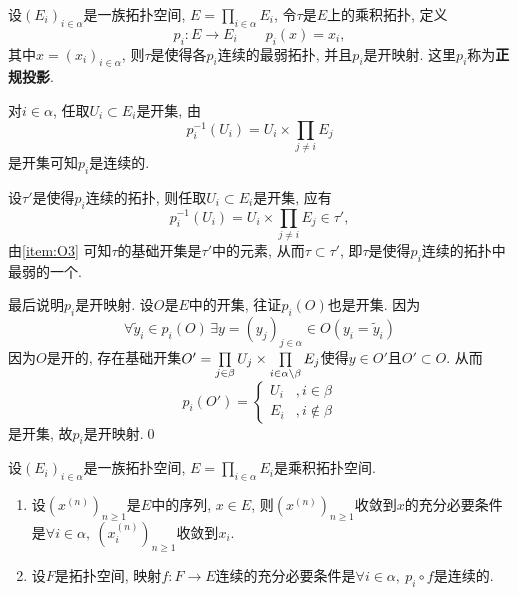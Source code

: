     \begin{Theorem}
    设$ (E_i)_{i\in\alpha} $是一族拓扑空间, $ E=\prod_{i\in\alpha}E_i $, 令$ \tau $是$ E $上的乘积拓扑, 定义
    \[
    p_i : E\to E_i\qquad p_i(x)=x_i,
    \]
    其中$ x=(x_i)_{i\in\alpha} $, 则$ \tau $是使得各$ p_i $连续的最弱拓扑, 并且$ p_i $是开映射. 这里$ p_i $称为\textbf{正规投影}.
    \end{Theorem}
    \begin{Proof}
    对$ i\in\alpha $, 任取$ U_i\subset E_i $是开集, 由
    \[
    p_i^{-1}(U_i)=U_i\times\prod_{j\ne i}E_j
    \]
    是开集可知$ p_i $是连续的.

    设$ \tau' $是使得$ p_i $连续的拓扑, 则任取$ U_i\subset E_i $是开集, 应有
    \[
    p_i^{-1}(U_i)=U_i\times\prod_{j\ne i}E_j\in\tau',
    \]
    由\ref{item:O3} 可知$ \tau $的基础开集是$ \tau' $中的元素, 从而$ \tau\subset\tau' $, 即$ \tau $是使得$ p_i $连续的拓扑中最弱的一个.

    最后说明$ p_i $是开映射. 设$ O $是$ E $中的开集, 往证$ p_i(O) $也是开集. 因为
    \[
    \forall \tilde{y}_i\in p_i(O)\,\exists y=(y_j)_{j\in\alpha}\in O(y_i=\tilde{y}_i)
    \]
    因为$ O $是开的, 存在基础开集$ O'=\prod\limits_{j\in\beta}U_j\times\prod\limits_{i\in\alpha\setminus\beta}E_j $使得$ y\in O' $且$ O'\subset O $. 从而
    \[
    p_i(O')=\begin{cases}
    U_i & ,i\in\beta\\ E_i &, i\notin\beta
    \end{cases}
    \]
    是开集, 故$ p_i $是开映射.\qed
    \end{Proof}

    \begin{Corollary}
    设$ (E_i)_{i\in\alpha} $是一族拓扑空间, $ E=\prod\limits_{i\in\alpha}E_i $是乘积拓扑空间.
    \begin{enumerate}[(1)]
    \item 设$ (x^{(n)})_{n\geqslant 1} $是$ E $中的序列, $ x\in E $, 则$ (x^{(n)})_{n\geqslant 1} $收敛到$ x $的充分必要条件是$\forall i\in\alpha,\  (x_i^{(n)})_{n\geqslant 1} $收敛到$ x_i $.

    \item 设$ F $是拓扑空间, 映射$ f : F\to E $连续的充分必要条件是$ \forall i\in\alpha,\ p_i\circ f $是连续的.
    \end{enumerate}
    \end{Corollary}

